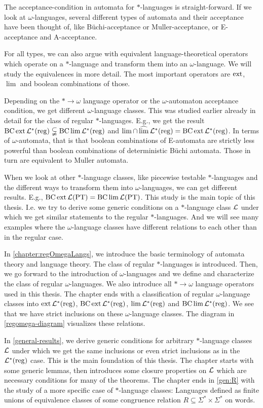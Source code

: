 The acceptance-condition in automata for $*$-languages is straight-forward. If we look at $\omega$-languages, several different types of automata and their acceptance have been thought of, like Büchi-acceptance or Muller-acceptance, or E-acceptance and A-acceptance.

For all types, we can also argue with equivalent language-theoretical operators which operate on a $*$-language and transform them into an $\omega$-language. We will study the equivalences in more detail. The most important operators are $\operatorname{ext}$, $\lim$ and boolean combinations of those.

Depending on the $* \rightarrow \omega$ language operator or the $\omega$-automaton acceptance condition, we get different $\omega$-language classes. This was studied earlier already in detail for the class of regular $*$-languages. E.g., we get the result $\operatorname{BC} \operatorname{ext} \mathcal{L}^*(\textup{\textrm{reg}}) \subsetneqq \operatorname{BC} \lim \mathcal{L}^*(\textup{\textrm{reg}})$ and $\lim \cap \operatorname{\widehat{lim}} \mathcal{L}^*(\textup{\textrm{reg}}) = \operatorname{BC} \operatorname{ext} \mathcal{L}^*(\textup{\textrm{reg}})$. In terms of $\omega$-automata, that is that boolean combinations of E-automata are strictly less powerful than boolean combinations of deterministic Büchi automata. Those in turn are equivalent to Muller automata.

When we look at other $*$-language classes, like piecewise testable $*$-languages and the different ways to transform them into $\omega$-languages, we can get different results. E.g., $\operatorname{BC} \operatorname{ext} \mathcal{L}(\textup{\textrm{PT}}) = \operatorname{BC} \lim \mathcal{L}(\textup{\textrm{PT}})$. This study is the main topic of this thesis. I.e. we try to derive some generic conditions on a $*$-language class $\mathcal{L}$ under which we get similar statements to the regular $*$-languages. And we will see many examples where the $\omega$-language classes have different relations to each other than in the regular case.

In \cref{chapter:regOmegaLangs}, we introduce the basic terminology of automata theory and language theory. The class of regular $*$-languages is introduced. Then, we go forward to the introduction of $\omega$-languages and we define and characterize the class of regular $\omega$-languages. We also introduce all $* \rightarrow \omega$ language operators used in this thesis. The chapter ends with a classification of regular $\omega$-language classes into $\operatorname{ext} \mathcal{L}^*(\textup{\textrm{reg}})$, $\operatorname{BC} \operatorname{ext} \mathcal{L}^*(\textup{\textrm{reg}})$, $\lim \mathcal{L}^*(\textup{\textrm{reg}})$ and $\operatorname{BC} \lim \mathcal{L}^*(\textup{\textrm{reg}})$. We see that we have strict inclusions on these $\omega$-language classes. The diagram in \cref{regomega-diagram} visualizes these relations.

In \cref{general-results}, we derive generic conditions for arbitrary $*$-language classes $\mathcal{L}$ under which we get the same inclusions or even strict inclusions as in the $\mathcal{L}^*(\textup{\textrm{reg}})$ case. This is the main foundation of this thesis. The chapter starts with some generic lemmas, then introduces some closure properties on $\mathcal{L}$ which are necessary conditions for many of the theorems. The chapter ends in \cref{gen:R} with the study of a more specific case of $*$-language classes: Languages defined as finite unions of equivalence classes of some congruence relation $R \subseteq \Sigma^*\times\Sigma^*$ on words.

